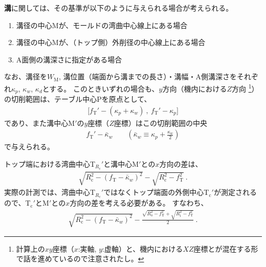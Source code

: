 




\textbf{溝}に関しては、その基準が以下のように与えられる場合が考えられる。
\begin{enumerate}
\item {}溝径の中心Mが、モールドの湾曲中心線上にある場合
\item {}溝径の中心Mが、（トップ側）外削径の中心線上にある場合
\item {}A面側の溝深さに指定がある場合
\end{enumerate}
なお、溝径を$W_\mathrm M$, 溝位置（端面から溝までの長さ）・溝幅・A側溝深さをそれぞれ$\kappa_p$, $\kappa_w$, $\kappa_d$とする。
このときいずれの場合も、$y$方向（機内における$Z$方向
\footnote{計算上の$xy$座標（$x$:実軸, $y$:虚軸）と、機内における$XZ$座標とが混在する形で話を進めているので注意されたし。}）
の切削範囲は、テーブル中心Pを原点として、
\begin{align*}
  \big[f_\mathrm T'-(\kappa_p+\kappa_w)\ ,\ f_\mathrm T'-\kappa_p\big]
\end{align*}
であり、また溝中心M$'$の$y$座標（$Z$座標）はこの切削範囲の中央
\begin{align}
  \label{eq:mizocenterZ}
  f_\mathrm T'-\bar\kappa_w \qquad
  \left(\bar\kappa_w \equiv \kappa_p+\frac{\kappa_w}2\right)
\end{align}
で与えられる。



\clearpage
トップ端における湾曲中心T$_{R_\mathrm c}'$と溝中心M$'$との$x$方向の差は、
\begin{align*}
  \sqrt{R_\mathrm c^2-\left(f_\mathrm T-\bar\kappa_w\right)^2}
  -\sqrt{R_\mathrm c^2-f_\mathrm T^2}\ .
\end{align*}
実際の計測では、湾曲中心T$_{R_\mathrm c}'$ではなくトップ端面の外側中心T$_\mathrm c'$が測定されるので、T$_\mathrm c'$とM$'$との$x$方向の差を考える必要がある。
すなわち、
\begin{align}
  \label{eq:difTopMizoCenter}
  \sqrt{R_\mathrm c^2-\left(f_\mathrm T-\bar\kappa_w\right)^2}
  -\frac{\sqrt{R_\mathrm o^2-f_\mathrm T^2}+\sqrt{R_\mathrm i^2-f_\mathrm T^2}}2\ .
\end{align}




